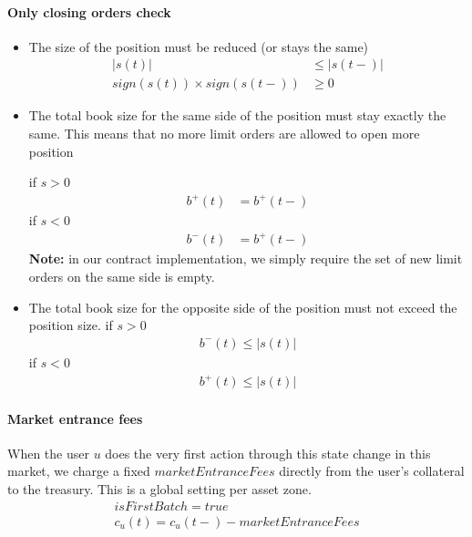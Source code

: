 \documentclass{article}%
\begin{document}
\paragraph{Only closing orders check}
\begin{itemize}
    \item The size of the position must be reduced (or stays the same)
    \begin{align}
        | s (t) | &\leq | s (t-) | \\
        sign (s (t)) \times sign (s (t-)) &\geq 0
    \end{align}
    
    \item The total book size for the same side of the position must stay exactly the same. This means that no more limit orders are allowed to open more position
    
    if $s > 0$
    \begin{align*}
        b^+(t) &= b^+(t-)
    \end{align*}
    if $s < 0$
    \begin{align*}
        b^-(t) &= b^+(t-)
    \end{align*}
    \textbf{Note:} in our contract implementation, we simply require the set of new limit orders on the same side is empty.
    \item The total book size for the opposite side of the position must not exceed the position size.
    if $s > 0$
    \begin{align*}
        b^-(t) \leq |s(t)|
    \end{align*}
    if $s < 0$
    \begin{align*}
        b^+(t) \leq |s(t)|
    \end{align*}
\end{itemize}

\paragraph{Market entrance fees}
When the user $u$ does the very first action through this state change in this market, we charge a fixed $marketEntranceFees$ directly from the user's collateral to the treasury. This is a global setting per asset zone.
\begin{align*}
    isFirstBatch = true\\
    c_u(t) = c_u(t-) - marketEntranceFees\\
\end{align*}
\end{document}
